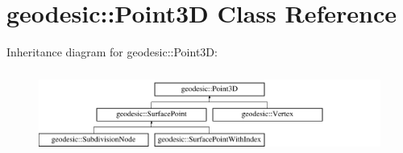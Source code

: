 \hypertarget{classgeodesic_1_1_point3_d}{}\section{geodesic\+:\+:Point3\+D Class Reference}
\label{classgeodesic_1_1_point3_d}
Inheritance diagram for geodesic\+:\+:Point3\+D\+:\begin{figure}[H]
\begin{center}
\leavevmode
\includegraphics[height=2.745098cm]{classgeodesic_1_1_point3_d}
\end{center}
\end{figure}
